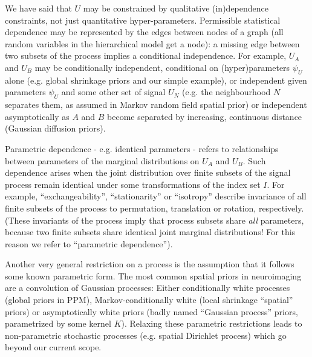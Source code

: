 \documentclass{article}
\begin{document}
We have said that $U$ may be constrained by qualitative (in)dependence constraints, not just quantitative hyper-parameters. Permissible statistical dependence may be represented by the edges between nodes of a graph (all random variables in the hierarchical model get a node): a missing edge between two subsets of the process implies a conditional independence. For example, $U_A$ and $U_B$ may be conditionally independent, conditional on (hyper)parameters $\psi_U$ alone (e.g. global shrinkage priors and our simple example), or independent given parameters $\psi_U$ and some other set of signal $U_N$ (e.g. the neighbourhood $N$ separates them, as assumed in Markov random field spatial prior) or independent asymptotically  as $A$ and $B$ become separated by increasing, continuous distance (Gaussian diffusion priors). 

Parametric dependence - e.g. identical parameters - refers to relationships between parameters of the marginal distributions on $U_A$ and $U_B$. Such dependence arises when the joint distribution over finite subsets of the signal process remain identical under some transformations of the index set $I$. For example, ``exchangeability'', ``stationarity'' or ``isotropy'' describe invariance of all finite subsets of the process to permutation, translation or rotation, respectively. (These invariants of the process imply that process subsets share \textit{all} parameters, because two finite subsets share identical joint marginal distributions! For this reason we refer to ``parametric dependence'').

Another very general restriction on a process is the assumption that it follows some known parametric form. The most common spatial priors in neuroimaging are a convolution of Gaussian processes: Either conditionally white processes (global priors in PPM), Markov-conditionally white (local shrinkage ``spatial'' priors) or asymptotically white priors (badly named ``Gaussian process'' priors, parametrized by some kernel $K$). Relaxing these parametric restrictions leads to non-parametric stochastic processes (e.g. spatial Dirichlet process) which go beyond our current scope. 
\end{document}
